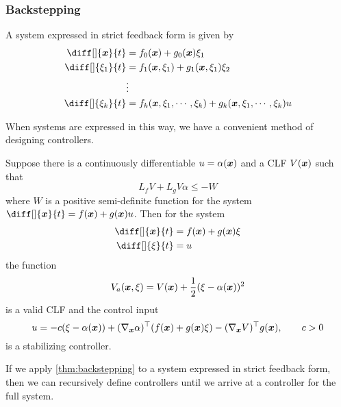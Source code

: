 \subsubsection{Backstepping}
\begin{definition}
	A system expressed in strict feedback form is given by \[
		\begin{aligned}
			\diff[]{\bs{x}}{t} &= f_0(\bs{x}) + g_0(\bs{x})\xi_1\\
			\diff[]{\xi_1}{t} &= f_1(\bs{x}, \xi_1) + g_1(\bs{x}, \xi_1)\xi_2\\
			&\vdots\\
			\diff[]{\xi_k}{t} &= f_k(\bs{x}, \xi_1,\cdots,\xi_k) + g_k(\bs{x},
			\xi_1,\cdots,\xi_k)u\\
		\end{aligned}
	\]
	\label{defn:strict-feedback-form}
\end{definition}
When systems are expressed in this way, we have a convenient method of designing
controllers.
\begin{theorem}
	Suppose there is a continuously differentiable $u=\alpha(\boldsymbol{x})$ and a CLF
	$V(\boldsymbol{x})$ such that \[
		L_fV + L_gV\alpha \leq -W
	\] where $W$ is a positive semi-definite function for the system
	$\diff[]{\bs{x}}{t} = f(\bs{x})+g(\bs{x})u$. Then for the system \[
		\begin{aligned}
			\diff[]{\bs{x}}{t} &= f(\bs{x}) + g(\bs{x})\xi\\
			\diff[]{\xi}{t} &= u
		\end{aligned}
	\]
	the function \[
		V_a(\boldsymbol{x},\xi) = V(\boldsymbol{x}) + \frac{1}{2}(\xi - \alpha(\boldsymbol{x}))^2
	\] is a valid CLF and the control input \[
		u = -c(\xi-\alpha(\boldsymbol{x})) + (\nabla_{\boldsymbol{x}}\alpha)^\top(f(\boldsymbol{x}) +
		g(\boldsymbol{x})\xi) - (\nabla_{\boldsymbol{x}}V)^\top g(\boldsymbol{x}), \qquad c > 0
	\]
	is a stabilizing controller.
	\label{thm:backstepping}
\end{theorem}
If we apply \cref{thm:backstepping} to a system expressed in strict feedback
form, then we can recursively define controllers until we arrive at a controller
for the full system.


